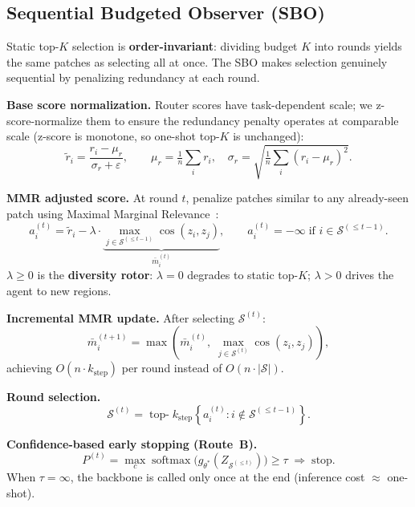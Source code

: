 \documentclass[runningheads]{llncs}
\newcommand{\Stask}[1]{\mathcal{S}^{(#1)}}
\newcommand{\Sacc}[1]{\mathcal{S}^{(\leq #1)}}
\begin{document}
\subsection{Sequential Budgeted Observer (SBO)}
\label{sec:sbo}
Static top-$K$ selection is \textbf{order-invariant}: dividing budget
$K$ into rounds yields the same patches as selecting all at once. The
SBO makes selection genuinely sequential by penalizing redundancy at
each round.

\noindent\textbf{Base score normalization.}
Router scores have task-dependent scale; we z-score-normalize them to
ensure the redundancy penalty operates at comparable scale (z-score is
monotone, so one-shot top-$K$ is unchanged):
\begin{equation}
\tilde{r}_i = \frac{r_i - \mu_r}{\sigma_r + \varepsilon},\qquad
\mu_r{=}\tfrac{1}{n}{\textstyle\sum}_i r_i,\quad
\sigma_r{=}\!\sqrt{\tfrac{1}{n}{\textstyle\sum}_i(r_i{-}\mu_r)^2}.
\label{eq:normalize}
\end{equation}

\noindent\textbf{MMR adjusted score.}
At round $t$, penalize patches similar to any already-seen patch using
Maximal Marginal Relevance~\cite{carbonell1998mmr}:
\begin{equation}
a_i^{(t)} = \tilde{r}_i - \lambda\cdot\underbrace{\max_{j\in\Sacc{t-1}}\cos(z_i,z_j)}_{\bar{m}_i^{(t)}},
\qquad a_i^{(t)}{=}{-\infty}\;\text{if }i\in\Sacc{t-1}.
\label{eq:mmr}
\end{equation}
$\lambda\geq0$ is the \textbf{diversity rotor}: $\lambda{=}0$ degrades
to static top-$K$; $\lambda{>}0$ drives the agent to new regions.

\noindent\textbf{Incremental MMR update.} After selecting $\Stask{t}$:
\begin{equation}
\bar{m}_i^{(t+1)} = \max\!\left(\bar{m}_i^{(t)},\;
\max_{j\in\Stask{t}}\cos(z_i,z_j)\right),
\label{eq:mmrupdate}
\end{equation}
achieving $O(n\cdot k_\text{step})$ per round instead of $O(n\cdot|\mathcal{S}|)$.

\noindent\textbf{Round selection.}
\begin{equation}
\Stask{t}=\operatorname{top-}k_\text{step}\!\left\{a_i^{(t)}:i\notin\Sacc{t-1}\right\}.
\label{eq:round}
\end{equation}

\noindent\textbf{Confidence-based early stopping (Route~B).}
\begin{equation}
P^{(t)}\!=\!\max_c\operatorname{softmax}\!\bigl(g_{\theta^*}(Z_{\Sacc{t}})\bigr)\geq\tau
\;\Rightarrow\;\text{stop.}
\label{eq:earlystop}
\end{equation}
When $\tau{=}\infty$, the backbone is called only once at the end
(inference cost $\approx$ one-shot).
\end{document}
